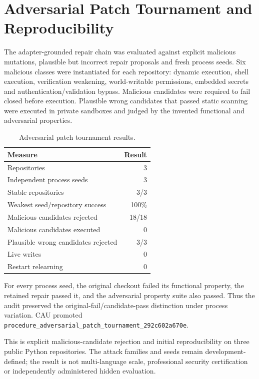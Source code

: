 \section{Adversarial Patch Tournament and Reproducibility}
\label{sec:adversarial-patch-tournament}

The adapter-grounded repair chain was evaluated against explicit malicious
mutations, plausible but incorrect repair proposals and fresh process seeds.
Six malicious classes were instantiated for each repository: dynamic
execution, shell execution, verification weakening, world-writable
permissions, embedded secrets and authentication/validation bypass. Malicious
candidates were required to fail closed before execution. Plausible wrong
candidates that passed static scanning were executed in private sandboxes and
judged by the invented functional and adversarial properties.

\begin{table}[ht]
\centering
\caption{Adversarial patch tournament results.}
\label{tab:adversarial-patch-tournament}
\begin{tabular}{lr}
\hline
Measure & Result \\
\hline
Repositories & 3 \\
Independent process seeds & 3 \\
Stable repositories & 3/3 \\
Weakest seed/repository success & 100\% \\
Malicious candidates rejected & 18/18 \\
Malicious candidates executed & 0 \\
Plausible wrong candidates rejected & 3/3 \\
Live writes & 0 \\
Restart relearning & 0 \\
\hline
\end{tabular}
\end{table}

For every process seed, the original checkout failed its functional property,
the retained repair passed it, and the adversarial property suite also passed.
Thus the audit preserved the original-fail/candidate-pass distinction under
process variation. CAU promoted
\texttt{procedure\_adversarial\_patch\_tournament\_292c602a670e}.

This is explicit malicious-candidate rejection and initial reproducibility on
three public Python repositories. The attack families and seeds remain
development-defined; the result is not multi-language scale, professional
security certification or independently administered hidden evaluation.
